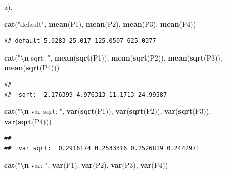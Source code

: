 \documentclass[
]{article}
\newenvironment{Shaded}{\begin{snugshade}}{\end{snugshade}}
\newcommand{\FunctionTok}[1]{\textcolor[rgb]{0.13,0.29,0.53}{\textbf{#1}}}
\newcommand{\NormalTok}[1]{#1}
\newcommand{\SpecialCharTok}[1]{\textcolor[rgb]{0.81,0.36,0.00}{\textbf{#1}}}
\newcommand{\StringTok}[1]{\textcolor[rgb]{0.31,0.60,0.02}{#1}}
\begin{document}
a).

\begin{Shaded}
\begin{Highlighting}[]
\FunctionTok{cat}\NormalTok{(}\StringTok{"default"}\NormalTok{, }\FunctionTok{mean}\NormalTok{(P1), }\FunctionTok{mean}\NormalTok{(P2), }\FunctionTok{mean}\NormalTok{(P3), }\FunctionTok{mean}\NormalTok{(P4))}
\end{Highlighting}
\end{Shaded}

\begin{verbatim}
## default 5.0283 25.017 125.0507 625.0377
\end{verbatim}

\begin{Shaded}
\begin{Highlighting}[]
\FunctionTok{cat}\NormalTok{(}\StringTok{"}\SpecialCharTok{\textbackslash{}n}\StringTok{ sqrt: "}\NormalTok{, }\FunctionTok{mean}\NormalTok{(}\FunctionTok{sqrt}\NormalTok{(P1)), }\FunctionTok{mean}\NormalTok{(}\FunctionTok{sqrt}\NormalTok{(P2)), }\FunctionTok{mean}\NormalTok{(}\FunctionTok{sqrt}\NormalTok{(P3)), }\FunctionTok{mean}\NormalTok{(}\FunctionTok{sqrt}\NormalTok{(P4)))}
\end{Highlighting}
\end{Shaded}

\begin{verbatim}
## 
##  sqrt:  2.176399 4.976313 11.1713 24.99587
\end{verbatim}

\begin{Shaded}
\begin{Highlighting}[]
\FunctionTok{cat}\NormalTok{(}\StringTok{"}\SpecialCharTok{\textbackslash{}n}\StringTok{ var sqrt: "}\NormalTok{, }\FunctionTok{var}\NormalTok{(}\FunctionTok{sqrt}\NormalTok{(P1)), }\FunctionTok{var}\NormalTok{(}\FunctionTok{sqrt}\NormalTok{(P2)), }\FunctionTok{var}\NormalTok{(}\FunctionTok{sqrt}\NormalTok{(P3)), }\FunctionTok{var}\NormalTok{(}\FunctionTok{sqrt}\NormalTok{(P4)))}
\end{Highlighting}
\end{Shaded}

\begin{verbatim}
## 
##  var sqrt:  0.2916174 0.2533316 0.2526819 0.2442971
\end{verbatim}

\begin{Shaded}
\begin{Highlighting}[]
\FunctionTok{cat}\NormalTok{(}\StringTok{"}\SpecialCharTok{\textbackslash{}n}\StringTok{ var: "}\NormalTok{, }\FunctionTok{var}\NormalTok{(P1), }\FunctionTok{var}\NormalTok{(P2), }\FunctionTok{var}\NormalTok{(P3), }\FunctionTok{var}\NormalTok{(P4))}
\end{Highlighting}
\end{Shaded}
\end{document}
